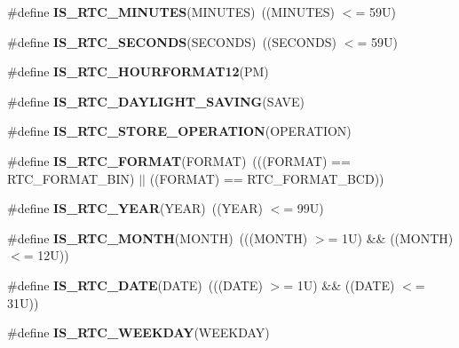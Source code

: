 \begin{DoxyCompactItemize}
\#define {\bfseries I\+S\+\_\+\+R\+T\+C\+\_\+\+M\+I\+N\+U\+T\+ES}(M\+I\+N\+U\+T\+ES)~((M\+I\+N\+U\+T\+ES) $<$= 59\+U)
\item 
\mbox{\label{group___r_t_c___i_s___r_t_c___definitions_gadb5a39d98fc906a8ea035bd29308bc5c}} 
\#define {\bfseries I\+S\+\_\+\+R\+T\+C\+\_\+\+S\+E\+C\+O\+N\+DS}(S\+E\+C\+O\+N\+DS)~((S\+E\+C\+O\+N\+DS) $<$= 59\+U)
\item 
\#define {\bfseries I\+S\+\_\+\+R\+T\+C\+\_\+\+H\+O\+U\+R\+F\+O\+R\+M\+A\+T12}(PM)
\item 
\#define {\bfseries I\+S\+\_\+\+R\+T\+C\+\_\+\+D\+A\+Y\+L\+I\+G\+H\+T\+\_\+\+S\+A\+V\+I\+NG}(S\+A\+VE)
\item 
\#define {\bfseries I\+S\+\_\+\+R\+T\+C\+\_\+\+S\+T\+O\+R\+E\+\_\+\+O\+P\+E\+R\+A\+T\+I\+ON}(O\+P\+E\+R\+A\+T\+I\+ON)
\item 
\mbox{\label{group___r_t_c___i_s___r_t_c___definitions_ga05a1ca8558058d71322ccf1045b8fb1c}} 
\#define {\bfseries I\+S\+\_\+\+R\+T\+C\+\_\+\+F\+O\+R\+M\+AT}(F\+O\+R\+M\+AT)~(((F\+O\+R\+M\+AT) == R\+T\+C\+\_\+\+F\+O\+R\+M\+A\+T\+\_\+\+B\+IN) $\vert$$\vert$ ((F\+O\+R\+M\+AT) == R\+T\+C\+\_\+\+F\+O\+R\+M\+A\+T\+\_\+\+B\+CD))
\item 
\mbox{\label{group___r_t_c___i_s___r_t_c___definitions_gae59c9cfe6f9532ab26d74c25bcbe814b}} 
\#define {\bfseries I\+S\+\_\+\+R\+T\+C\+\_\+\+Y\+E\+AR}(Y\+E\+AR)~((Y\+E\+AR) $<$= 99\+U)
\item 
\mbox{\label{group___r_t_c___i_s___r_t_c___definitions_ga7fa60f17b2ae529c35b1fa3dd4d6853f}} 
\#define {\bfseries I\+S\+\_\+\+R\+T\+C\+\_\+\+M\+O\+N\+TH}(M\+O\+N\+TH)~(((M\+O\+N\+TH) $>$= 1\+U) \&\& ((\+M\+O\+N\+T\+H) $<$= 12\+U))
\item 
\mbox{\label{group___r_t_c___i_s___r_t_c___definitions_ga3b6e966e144cb0495563ef0283d16510}} 
\#define {\bfseries I\+S\+\_\+\+R\+T\+C\+\_\+\+D\+A\+TE}(D\+A\+TE)~(((D\+A\+TE) $>$= 1\+U) \&\& ((\+D\+A\+T\+E) $<$= 31\+U))
\item 
\#define {\bfseries I\+S\+\_\+\+R\+T\+C\+\_\+\+W\+E\+E\+K\+D\+AY}(W\+E\+E\+K\+D\+AY)
\item 
\mbox{\label{group___r_t_c___i_s___r_t_c___definitions_ga8b6cb39fac113de7c5d2b05a93093243}} 
$$
\end{DoxyCompactItemize}
